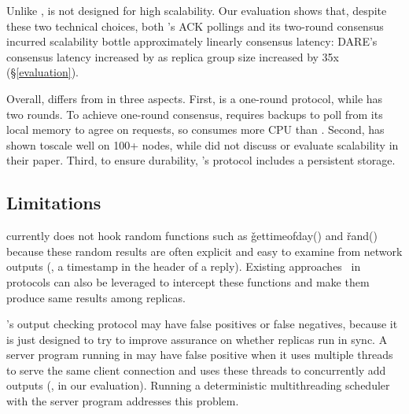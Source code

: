 Unlike \xxx, \dare is not designed for high scalability. Our evaluation shows 
that, despite these two technical choices, both \dare's ACK pollings and its 
two-round consensus incurred scalability bottle approximately linearly consensus 
latency: DARE's consensus latency increased by \darescalability as replica group 
size increased by 35x (\S\ref{evaluation}).

Overall, \xxx differs from \dare in three aspects. First, \xxx is a one-round 
protocol, while \dare has two rounds. To achieve one-round consensus, \xxx 
requires backups to poll from its local memory to agree on requests, so \xxx 
consumes more CPU than \dare. Second, \xxx has shown toscale well on 100+ nodes, 
while \dare did not discuss or evaluate scalability in their paper. Third, to 
ensure durability, \xxx's protocol includes a persistent storage.

\subsection{\xxx Limitations}\label{sec:limits}


\xxx currently does not hook random functions such as \v{gettimeofday()} and 
\v{rand()} because these random results are often explicit and easy to examine 
from network outputs (\eg, a timestamp in the header of a reply). Existing 
approaches~\cite{eve:osdi12,paxos:practical} in \paxos protocols can also be 
leveraged to intercept these functions and make them produce same results among 
replicas.


\xxx's output checking protocol may have false positives or false negatives, 
because it is just designed to try to improve assurance on whether replicas run 
in sync. A server program running in \xxx may have false positive when it uses 
multiple threads to serve the same client connection and uses these threads to 
concurrently add outputs (\eg, \clamav in our evaluation). 
Running a deterministic multithreading 
scheduler~\cite{coredet:asplos10,parrot:sosp13} with the server program 
addresses this problem.

